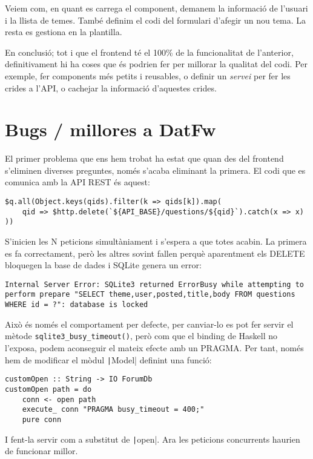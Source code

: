 \documentclass[catalan, a4paper]{scrartcl}
\begin{document}
Veiem com, en quant es carrega el component, demanem la informació
de l'usuari i la llista de temes. També definim el codi del formulari
d'afegir un nou tema. La resta es gestiona en la plantilla.

En conclusió; tot i que el frontend té el 100\% de la funcionalitat de
l'anterior, definitivament hi ha coses que és podrien fer per millorar
la qualitat del codi. Per exemple, fer components més petits i reusables,
o definir un \emph{servei} per fer les crides a l'API, o cachejar la
informació d'aquestes crides.


\section{Bugs / millores a DatFw}

El primer problema que ens hem trobat ha estat que quan des del frontend
s'eliminen diverses preguntes, només s'acaba eliminant la primera.
El codi que es comunica amb la API REST és aquest:

\begin{verbatim}
$q.all(Object.keys(qids).filter(k => qids[k]).map(
    qid => $http.delete(`${API_BASE}/questions/${qid}`).catch(x => x)
))
\end{verbatim}

S'inicien les N peticions simultàniament i s'espera a que totes acabin.
La primera es fa correctament, però les altres sovint fallen perquè
aparentment els \textsf{DELETE} bloquegen la base de dades i SQLite genera
un error:

\begin{verbatim}
Internal Server Error: SQLite3 returned ErrorBusy while attempting to
perform prepare "SELECT theme,user,posted,title,body FROM questions
WHERE id = ?": database is locked
\end{verbatim}

Això és només el comportament per defecte, per canviar-lo es pot fer servir
el mètode \texttt{sqlite3_busy_timeout()}, però com que el binding
de Haskell no l'exposa, podem aconseguir el mateix efecte amb un PRAGMA.
Per tant, només hem de modificar el mòdul \texttt|Model|
definint una funció:

\begin{verbatim}
customOpen :: String -> IO ForumDb
customOpen path = do
    conn <- open path
    execute_ conn "PRAGMA busy_timeout = 400;"
    pure conn
\end{verbatim}

I fent-la servir com a substitut de \texttt|open|. Ara les
peticions concurrents haurien de funcionar millor.
\end{document}

